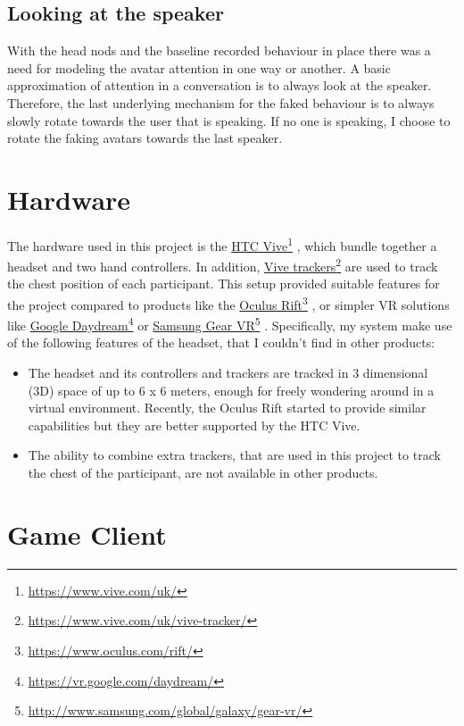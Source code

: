\documentclass[]{simple-thesis}
\newcommand\fnurl[2]{%
  \href{#2}{#1}\footnote{\url{#2}}%
}
\begin{document}
\subsection{Looking at the speaker}

With the head nods and the baseline recorded behaviour in place there was a need for modeling the avatar attention in one way or another.
A basic approximation of attention in a conversation is to always look at the speaker.
Therefore, the last underlying mechanism for the faked behaviour is to always slowly rotate towards the user that is speaking.
If no one is speaking, I choose to rotate the faking avatars towards the last speaker.

\section{Hardware}

The hardware used in this project is the \fnurl{HTC Vive}{https://www.vive.com/uk/}, which bundle together a headset and two hand controllers.
In addition, \fnurl{Vive trackers}{https://www.vive.com/uk/vive-tracker/} are used to track the chest position of each participant.
This setup provided suitable features for the project compared to products like the \fnurl{Oculus Rift}{https://www.oculus.com/rift/}, or simpler VR solutions like \fnurl{Google Daydream}{https://vr.google.com/daydream/} or \fnurl{Samsung Gear VR}{http://www.samsung.com/global/galaxy/gear-vr/}.
Specifically, my system make use of the following features of the headset, that I couldn't find in other products:

\begin{itemize}
  \item The headset and its controllers and trackers are tracked in 3 dimensional (3D) space of up to 6 x 6 meters, enough for freely wondering around in a virtual environment. Recently, the Oculus Rift started to provide similar capabilities but they are better supported by the HTC Vive.
  \item The ability to combine extra trackers, that are used in this project to track the chest of the participant, are not available in other products.
\end{itemize}

\section{Game Client}
\end{document}
